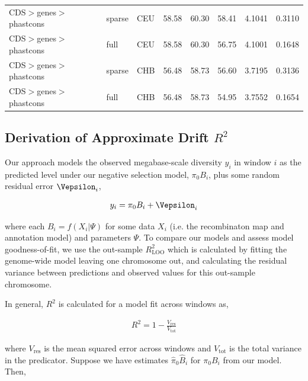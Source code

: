 \documentclass[11pt]{article}
\begin{document}
\begin{table}
\begin{tabular}{lll|crr|cc}
CDS$>$genes$>$phastcons &            sparse &          CEU &                        58.58 &             60.30 &            58.41 &                                 4.1041 &                                0.3110 \\
CDS$>$genes$>$phastcons &              full &          CEU &                        58.58 &             60.30 &            56.75 &                                 4.1001 &                                0.1648 \\
CDS$>$genes$>$phastcons &            sparse &          CHB &                        56.48 &             58.73 &            56.60 &                                 3.7195 &                                0.3136 \\
CDS$>$genes$>$phastcons &              full &          CHB &                        56.48 &             58.73 &            54.95 &                                 3.7552 &                                0.1654 \\
\hline
\end{tabular}
\end{table}


\subsection{Derivation of Approximate Drift $R^2$}

Our approach models the observed megabase-scale diversity $y_i$ in window $i$
as the predicted level under our negative selection model, $\pi_0 B_i$, plus
some random residual error $\Vepsilon_i$,

\begin{align}
    y_i = \pi_0 B_i + \Vepsilon_i
\end{align}

where each $B_i = f(X_i | \Psi)$ for some data $X_i$ (i.e. the recombinaton map
and annotation model) and parameters $\Psi$. To compare our models and assess
model goodness-of-fit, we use the out-sample $R_\text{LOO}^2$ which is
calculated by fitting the genome-wide model leaving one chromosome out, and
calculating the residual variance between predictions and observed values for
this out-sample chromosome. 

In general, $R^2$ is calculated for a model fit across windows as,

\begin{align}
    R^2 = 1 - \frac{V_\text{res}}{V_\text{tot}}
\end{align}

where $V_\text{res}$ is the mean squared error across windows and
$V_\text{tot}$ is the total variance in the predicator. Suppose we have
estimates $\widehat{\pi}_0 \widehat{B}_i$ for $\pi_0 B_i$ from our model. Then,
\end{document}
